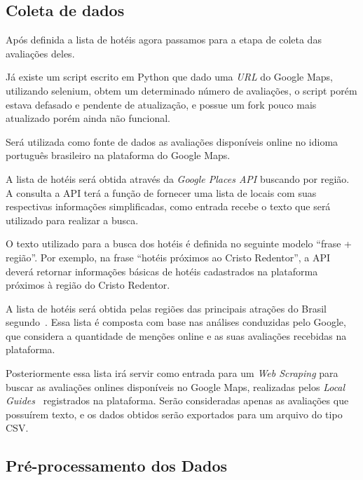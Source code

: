 

\subsection{Coleta de dados}

Após definida a lista de hotéis agora passamos para a etapa de coleta das avaliações deles.

Já existe um script escrito em Python \cite{gaspa93scrapper2023} que dado uma \emph{URL} do Google Maps, utilizando selenium, obtem um determinado número de avaliações, o script porém estava defasado e pendente de atualização, e possue um fork pouco  mais atualizado porém ainda não funcional.

Será utilizada como fonte de dados as avaliações disponíveis online no idioma português brasileiro na plataforma do Google Maps.

A lista de hotéis será obtida através da \emph{Google Places API} buscando por região. A consulta a API terá a função de fornecer uma lista de locais com suas respectivas informações simplificadas, como entrada recebe o texto que será utilizado para realizar a busca.

O texto utilizado para a busca dos hotéis é definida no seguinte modelo “frase + região”. Por exemplo, na frase “hotéis próximos ao Cristo Redentor”, a API deverá retornar informações básicas de hotéis cadastrados na plataforma próximos à região do Cristo Redentor.

A lista de hotéis será obtida pelas regiões das principais atrações do Brasil segundo~\cite{googleFlights2022destinos}. Essa lista é composta com base nas análises conduzidas pelo Google, que considera a quantidade de menções online e as suas avaliações recebidas na plataforma.

Posteriormente essa lista irá servir como entrada para um \emph{Web Scraping} para buscar as avaliações onlines disponíveis no Google Maps, realizadas pelos \emph{Local Guides}~\cite{google2022localguides} registrados na plataforma. Serão consideradas apenas as avaliações que possuírem texto, e os dados obtidos serão exportados para um arquivo do tipo CSV.

\subsection{Pré-processamento dos Dados}

